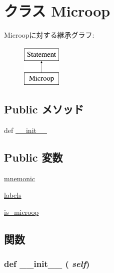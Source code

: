 \hypertarget{classmicro__asm_1_1Microop}{
\section{クラス Microop}
\label{classmicro__asm_1_1Microop}
}
Microopに対する継承グラフ:\begin{figure}[H]
\begin{center}
\leavevmode
\includegraphics[height=2cm]{classmicro__asm_1_1Microop}
\end{center}
\end{figure}
\subsection*{Public メソッド}
\begin{DoxyCompactItemize}
\item 
def \hyperlink{classmicro__asm_1_1Microop_ac775ee34451fdfa742b318538164070e}{\_\-\_\-init\_\-\_\-}
\end{DoxyCompactItemize}
\subsection*{Public 変数}
\begin{DoxyCompactItemize}
\item 
\hyperlink{classmicro__asm_1_1Microop_aaf1ad8da0f374cbd19a0a177d5280477}{mnemonic}
\item 
\hyperlink{classmicro__asm_1_1Microop_abc325fc13d4194905c1786e24ee447f0}{labels}
\item 
\hyperlink{classmicro__asm_1_1Microop_ad8d639c296a2174eaecfe07681b44d8d}{is\_\-microop}
\end{DoxyCompactItemize}


\subsection{関数}
\hypertarget{classmicro__asm_1_1Microop_ac775ee34451fdfa742b318538164070e}{
\subsubsection[{\_\-\_\-init\_\-\_\-}]{\setlength{\rightskip}{0pt plus 5cm}def \_\-\_\-init\_\-\_\- ( {\em self})}}
\label{classmicro__asm_1_1Microop_ac775ee34451fdfa742b318538164070e}


